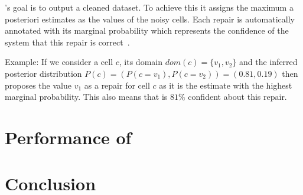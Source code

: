   \holoclean{}'s goal is to output a cleaned dataset.
  To achieve this it assigns the maximum a posteriori estimates as the values of the noisy cells.
  Each repair is automatically annotated with its marginal probability which represents the confidence of the system that this repair is correct~\cite{holoclean}. 
  
  Example: If we consider a cell $c$, its domain $dom(c)=\{v_1, v_2\}$ and the inferred posterior distribution $P(c) = ( P(c = v_1), P(c = v_2) ) = ( 0.81, 0.19 )$ then \holoclean{} proposes the value $v_1$ as a repair for cell $c$ as it is the estimate with the highest marginal probability.
  This also means that \holoclean{} is $81\%$ confident about this repair.

\section{Performance of \holoclean{}}\label{sec:performance}

\section{Conclusion}\label{sec:conclusion}